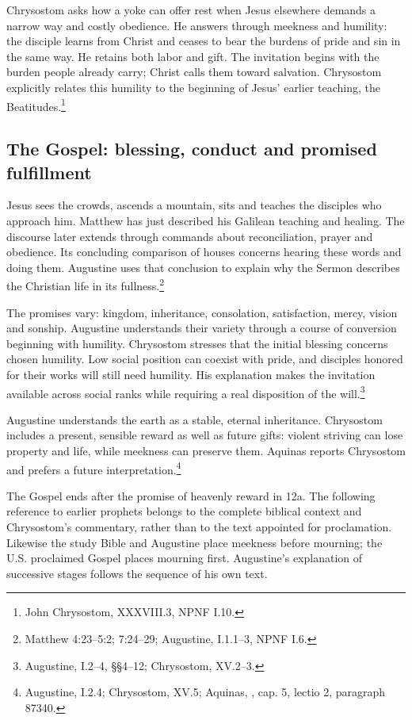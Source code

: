 Chrysostom asks how a yoke can offer rest when Jesus elsewhere demands a narrow way and costly obedience. He answers through meekness and humility: the disciple learns from Christ and ceases to bear the burdens of pride and sin in the same way. He retains both labor and gift. The invitation begins with the burden people already carry; Christ calls them toward salvation. Chrysostom explicitly relates this humility to the beginning of Jesus' earlier teaching, the Beatitudes.\footnote{John Chrysostom,  XXXVIII.3, NPNF I.10.}

\subsection{The Gospel: blessing, conduct and promised fulfillment}
Jesus sees the crowds, ascends a mountain, sits and teaches the disciples who approach him. Matthew has just described his Galilean teaching and healing. The discourse later extends through commands about reconciliation, prayer and obedience. Its concluding comparison of houses concerns hearing these words and doing them. Augustine uses that conclusion to explain why the Sermon describes the Christian life in its fullness.\footnote{Matthew 4:23--5:2; 7:24--29; Augustine,  I.1.1--3, NPNF I.6.}

The promises vary: kingdom, inheritance, consolation, satisfaction, mercy, vision and sonship. Augustine understands their variety through a course of conversion beginning with humility. Chrysostom stresses that the initial blessing concerns chosen humility. Low social position can coexist with pride, and disciples honored for their works will still need humility. His explanation makes the invitation available across social ranks while requiring a real disposition of the will.\footnote{Augustine,  I.2--4, §§4--12; Chrysostom,  XV.2--3.}

Augustine understands the earth as a stable, eternal inheritance. Chrysostom includes a present, sensible reward as well as future gifts: violent striving can lose property and life, while meekness can preserve them. Aquinas reports Chrysostom and prefers a future interpretation.\footnote{Augustine,  I.2.4; Chrysostom,  XV.5; Aquinas, , cap. 5, lectio 2, paragraph 87340.}

The Gospel ends after the promise of heavenly reward in 12a. The following reference to earlier prophets belongs to the complete biblical context and Chrysostom's commentary, rather than to the text appointed for proclamation. Likewise the study Bible and Augustine place meekness before mourning; the U.S. proclaimed Gospel places mourning first. Augustine's explanation of successive stages follows the sequence of his own text.

